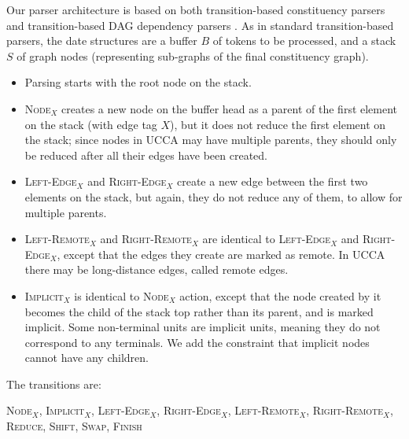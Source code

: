 \documentclass[11pt]{article}
\begin{document}
Our parser architecture is based on both transition-based constituency parsers \cite{zhu2013fast,maier2015discontinuous} and transition-based DAG dependency parsers \cite{sagae2008shift,tokgoz2015transition}.
As in standard transition-based parsers, the date structures are a buffer $B$ of tokens to be processed, and a stack $S$ of graph nodes (representing sub-graphs of the final constituency graph).

\begin{itemize}
	\item Parsing starts with the root node on the stack.
	\item \textsc{Node$_X$} creates a new node on the buffer head as a parent of the first element on the stack (with edge tag $X$), but it does not reduce the first element on the stack; since nodes in UCCA may have multiple parents, they should only be reduced after all their edges have been created.
	\item \textsc{Left-Edge$_X$} and \textsc{Right-Edge$_X$} create a new edge between the first two elements on the stack, but again, they do not reduce any of them, to allow for multiple parents.
	\item \textsc{Left-Remote$_X$} and \textsc{Right-Remote$_X$} are identical to \textsc{Left-Edge$_X$} and \textsc{Right-Edge$_X$}, except that the edges they create are marked as remote. In UCCA there may be long-distance edges, called remote edges.
	\item \textsc{Implicit$_X$} is identical to \textsc{Node$_X$} action, except that the node created by it becomes the child of the stack top rather than its parent, and is marked implicit. Some non-terminal units are implicit units, meaning they do not correspond to any terminals. We add the constraint that implicit nodes cannot have any children.
\end{itemize}

The transitions are:

\textsc{Node$_X$, Implicit$_X$, Left-Edge$_X$, Right-Edge$_X$, Left-Remote$_X$, Right-Remote$_X$, Reduce, Shift, Swap, Finish}
\end{document}
